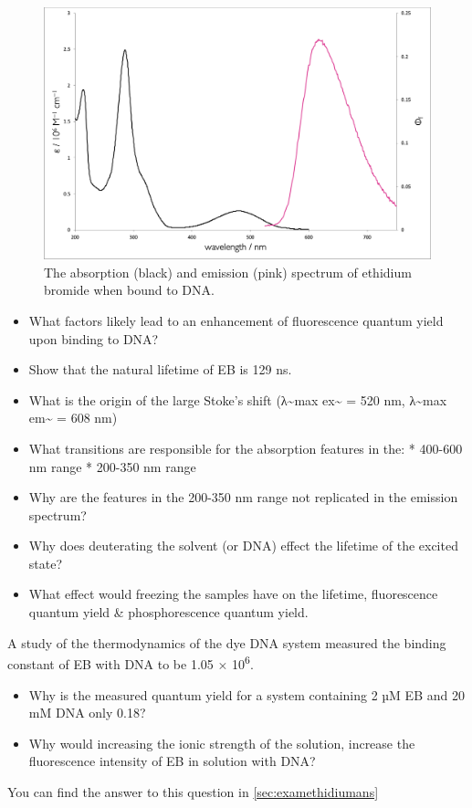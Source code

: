 \documentclass[
]{book}
\begin{document}
\begin{figure}

{\centering \includegraphics[width=0.3\linewidth]{images/ethidiumspectra} 

}

\caption{The absorption (black) and emission (pink) spectrum of ethidium bromide when bound to DNA.}\label{fig:ethidiumspectra}
\end{figure}

\begin{itemize}
\item
  What factors likely lead to an enhancement of fluorescence quantum yield upon binding to DNA?
\item
  Show that the natural lifetime of EB is 129 ns.
\item
  What is the origin of the large Stoke's shift (λ\textasciitilde max ex\textasciitilde{} = 520 nm, λ\textasciitilde max em\textasciitilde{} = 608 nm)
\item
  What transitions are responsible for the absorption features in the:
  * 400-600 nm range
  * 200-350 nm range
\item
  Why are the features in the 200-350 nm range not replicated in the emission spectrum?
\item
  Why does deuterating the solvent (or DNA) effect the lifetime of the excited state?
\item
  What effect would freezing the samples have on the lifetime, fluorescence quantum yield \& phosphorescence quantum yield.
\end{itemize}

A study of the thermodynamics of the dye DNA system measured the binding constant of EB with DNA to be 1.05 × 10\textsuperscript{6}.

\begin{itemize}
\item
  Why is the measured quantum yield for a system containing 2 µM EB and 20 mM DNA only 0.18?
\item
  Why would increasing the ionic strength of the solution, increase the fluorescence intensity of EB in solution with DNA?
\end{itemize}

You can find the answer to this question in \ref{sec:examethidiumans}
\end{document}
